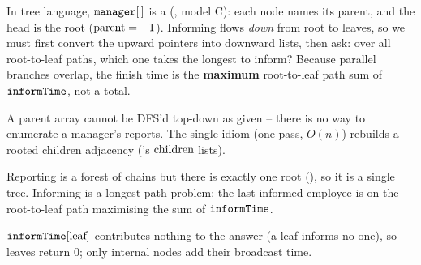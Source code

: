 In tree language, $\texttt{manager}[\,]$ is a  (,
model C): each node names its parent, and the head is the root ($\operatorname{parent}=-1$). Informing
flows \emph{down} from root to leaves, so we must first convert the upward pointers into
downward  lists, then ask: over all root-to-leaf paths, which one takes
the longest to inform? Because parallel branches overlap, the finish time is the
\textbf{maximum} root-to-leaf path sum of $\texttt{informTime}$, not a total.

\begin{observation}
A parent array cannot be DFS'd top-down as given -- there is no way to enumerate a
manager's reports. The single idiom  (one pass,
$O(n)$) rebuilds a rooted children adjacency ('s $\operatorname{children}$ lists).
\end{observation}
\begin{observation}
Reporting is a forest of chains but there is exactly one root (), so it is a
single tree. Informing is a longest-path problem: the last-informed employee is on the
root-to-leaf path maximising the sum of $\texttt{informTime}$.
\end{observation}
\begin{observation}
$\texttt{informTime}[\text{leaf}]$ contributes nothing to the answer (a leaf informs no
one), so leaves return $0$; only internal nodes add their broadcast time.
\end{observation}

\begin{thinkbox}
\end{thinkbox}

